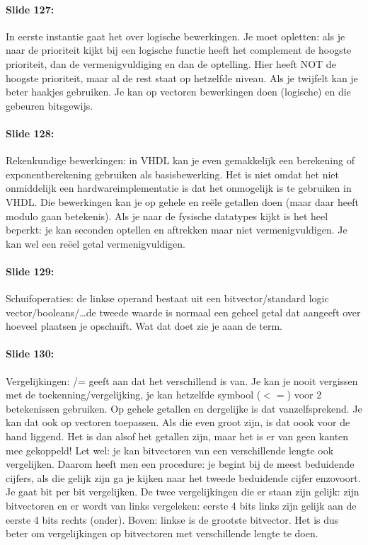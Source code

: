 \documentclass[10pt,a4paper]{book}
\begin{document}
\paragraph{Slide 127:} In eerste instantie gaat het over logische bewerkingen. Je moet opletten: als je naar de prioriteit kijkt bij een logische functie heeft het complement de hoogste prioriteit, dan de vermenigvuldiging en dan de optelling. Hier heeft NOT de hoogste prioriteit, maar al de rest staat op hetzelfde niveau. Als je twijfelt kan je beter haakjes gebruiken. Je kan op vectoren bewerkingen doen (logische) en die gebeuren bitsgewijs. 

\paragraph{Slide 128:} Rekenkundige bewerkingen: in VHDL kan je even gemakkelijk een berekening of exponentberekening gebruiken als basisbewerking. Het is niet omdat het niet onmiddelijk een hardwareimplementatie is dat het onmogelijk is te gebruiken in VHDL. Die bewerkingen kan je op gehele en re\"ele getallen doen (maar daar heeft modulo gaan betekenis). Als je naar de fysische datatypes kijkt is het heel beperkt: je kan seconden optellen en aftrekken maar niet vermenigvuldigen. Je kan wel een re\"eel getal vermenigvuldigen.

\paragraph{Slide 129:} Schuifoperaties: de linkse operand bestaat uit een bitvector/standard logic vector/booleans/\ldots de tweede waarde is normaal een geheel getal dat aangeeft over hoeveel plaatsen je opschuift. Wat dat doet zie je aaan de term.

\paragraph{Slide 130:} Vergelijkingen: /= geeft aan dat het verschillend is van. Je kan je nooit vergissen met de toekenning/vergelijking, je kan hetzelfde symbool ($<=$) voor 2 betekenissen gebruiken. Op gehele getallen en dergelijke is dat vanzelfsprekend. Je kan dat ook op vectoren toepassen. Als die even groot zijn, is dat oook voor de hand liggend. Het is dan alsof het getallen zijn, maar het is er van geen kanten mee gekoppeld! Let wel: je kan bitvectoren van een verschillende lengte ook vergelijken. Daarom heeft men een procedure: je begint bij de meest beduidende cijfers, als die gelijk zijn ga je kijken naar het tweede beduidende cijfer enzovoort. Je gaat bit per bit vergelijken. De twee vergelijkingen die er staan zijn gelijk: zijn bitvectoren en er wordt van links vergeleken: eerste 4 bits links zijn gelijk aan de eerste 4 bits rechts (onder). Boven: linkse is de grootste bitvector. Het is dus beter om vergelijkingen op bitvectoren met verschillende lengte te doen.
\end{document}
